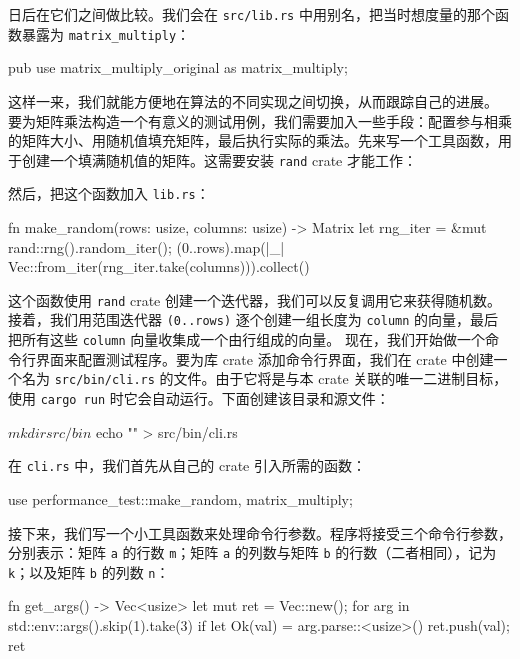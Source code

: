 日后在它们之间做比较。我们会在 \texttt{src/lib.rs} 中用别名，把当时想度量的那个函数暴露为 \texttt{matrix\_\allowbreak{}multiply}：
\begin{codebox}[rust]
pub use matrix_multiply_original as matrix_multiply;
\end{codebox}
\label{idx:idx_1b007b76}
这样一来，我们就能方便地在算法的不同实现之间切换，从而跟踪自己的进展。
要为矩阵乘法构造一个有意义的测试用例，我们需要加入一些手段：配置参与相乘的矩阵大小、用随机值填充矩阵，最后执行实际的乘法。先来写一个工具函数，用于创建一个填满随机值的矩阵。这需要安装 \texttt{rand} crate 才能工作：
然后，把这个函数加入 \texttt{lib.rs}：
\begin{codebox}[rust]
fn make_random(rows: usize, columns: usize) -> Matrix {
     let rng_iter = &mut rand::rng().random_iter();
     (0..rows).map(|_| Vec::from_iter(rng_iter.take(columns))).collect()
 }
\end{codebox}
这个函数使用 \texttt{rand} crate 创建一个迭代器，我们可以反复调用它来获得随机数。接着，我们用范围迭代器 \texttt{(0..rows)} 逐个创建一组长度为 \texttt{column} 的向量，最后把所有这些 \texttt{column} 向量收集成一个由行组成的向量。
现在，我们开始做一个命令行界面来配置测试程序。要为库 crate 添加命令行界面，我们在 crate 中创建一个名为 \texttt{src/\allowbreak{}bin/\allowbreak{}cli.\allowbreak{}rs} 的文件。由于它将是与本 crate 关联的唯一二进制目标，使用 \texttt{cargo run} 时它会自动运行。下面创建该目录和源文件：
\begin{codeboxdark}
$ mkdir src/bin
$ echo "" > src/bin/cli.rs
\end{codeboxdark}
在 \texttt{cli.rs} 中，我们首先从自己的 crate 引入所需的函数：
\begin{codebox}[rust]
use performance_test::{make_random, matrix_multiply};
\end{codebox}
\label{idx:idx_1d0f05c8}
接下来，我们写一个小工具函数来处理命令行参数。程序将接受三个命令行参数，分别表示：矩阵 \texttt{a} 的行数 \texttt{m}；矩阵 \texttt{a} 的列数与矩阵 \texttt{b} 的行数（二者相同），记为 \texttt{k}；以及矩阵 \texttt{b} 的列数 \texttt{n}：
\begin{codebox}[rust]
fn get_args() -> Vec<usize> {
     let mut ret = Vec::new();
     for arg in std::env::args().skip(1).take(3) {
         if let Ok(val) = arg.parse::<usize>() {
             ret.push(val);
         }
     }
     ret
 }
\end{codebox}
\label{idx:idx_041bd2c0}

